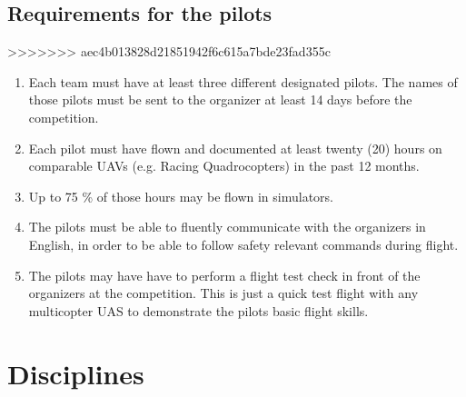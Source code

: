     \subsection{Requirements for the pilots}\label{SubSec:PilotRequirements}
>>>>>>> aec4b013828d21851942f6c615a7bde23fad355c
    \begin{enumerate}
      \item Each team must have at least three different designated pilots. The names of those pilots must be sent to the organizer at least 
      14 days before the competition. 
      \item Each pilot must have flown and documented at least twenty (20) hours on comparable UAVs (e.g. Racing Quadrocopters) in the past 12 months. 
      \item Up to 75 \% of those hours may be flown in simulators.
      \item The pilots must be able to fluently communicate with the organizers in English, in order to be able to follow safety relevant commands during flight.
      \item The pilots may have have to perform a flight test check in front of the organizers at the competition. This is just a quick test flight with any multicopter UAS to demonstrate the pilots basic flight skills.
    \end{enumerate}




    \section{Disciplines}
